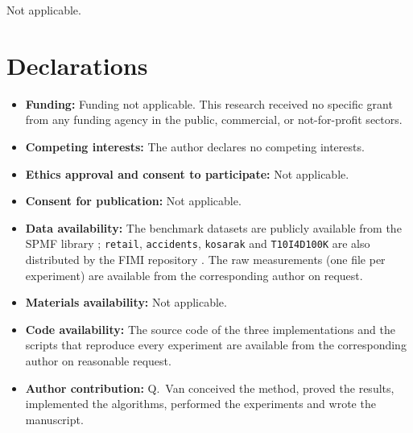 \documentclass[pdflatex,sn-mathphys,Numbered]{sn-jnl}
\theoremstyle{thmstyleone}
\theoremstyle{thmstyletwo}
\theoremstyle{thmstylethree}
\begin{document}
Not applicable.

\section*{Declarations}

\begin{itemize}
\item \textbf{Funding:} Funding not applicable. This research received no specific grant from any funding agency in the public, commercial, or not-for-profit sectors.
\item \textbf{Competing interests:} The author declares no competing interests.
\item \textbf{Ethics approval and consent to participate:} Not applicable.
\item \textbf{Consent for publication:} Not applicable.
\item \textbf{Data availability:} The benchmark datasets are publicly available from the SPMF library \cite{spmfdatasets,fournier2016spmf}; \texttt{retail}, \texttt{accidents}, \texttt{kosarak} and \texttt{T10I4D100K} are also distributed by the FIMI repository \cite{fimi2004repository}. The raw measurements (one file per experiment) are available from the corresponding author on request.
\item \textbf{Materials availability:} Not applicable.
\item \textbf{Code availability:} The source code of the three implementations and the scripts that reproduce every experiment are available from the corresponding author on reasonable request.
\item \textbf{Author contribution:} Q.~Van conceived the method, proved the results, implemented the algorithms, performed the experiments and wrote the manuscript.
\end{itemize}


\end{document}
